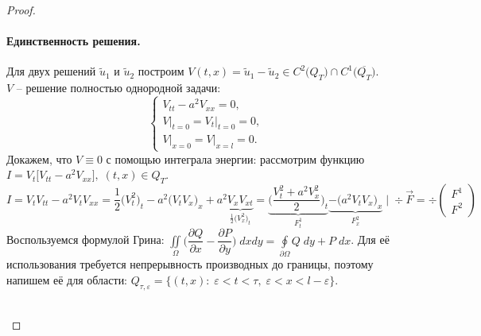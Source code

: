 \documentclass[../main.tex]{subfiles}
\begin{document}
\begin{proof}
\paragraph{Единственность решения.}
Для двух решений $\tilde{u}_{1}$ и $\tilde{u}_{2}$  построим $V(t, x) = \tilde{u}_{1} - \tilde{u}_{2} \in C^{2}\bigl(Q_{T}\bigr) \cap C^{1}\bigl(\overline{Q_T}\bigr)$.\\$V$ -- решение полностью однородной задачи:
\begin{equation*}
\begin{cases}
V_{tt} - a^2V_{xx} = 0, \\
V\bigr|_{t = 0} = V_t\bigr|_{t = 0} = 0, \\
V\bigr|_{x = 0} = V\bigr|_{x = l} = 0.
\end{cases}
\end{equation*}
Докажем, что $V \equiv 0$ с помощью интеграла энергии: рассмотрим функцию $I = V_{t}\bigl[V_{tt} - a^2V_{xx}\bigr],\; (t, x) \in Q_{T}$.
\begin{equation*}
I = V_{t}V_{tt} - a^2V_{t}V_{xx} = \dfrac{1}{2}\bigl(V_{t}^{2}\bigr)_{t} - a^2\bigl(V_{t}V_{x}
\bigr)_{x} + a^2\underbrace{V_{x}V_{xt}}_{\frac{1}{2} \bigl(V_{x}^{2}\bigr)_{t}} = \underbrace{\biggl(\dfrac{V_{t}^2 + a^2V_{x}^{2}}{2}\biggr)_{t}}_{F^1_t}  \underbrace{ - \bigl(a^{2}V_{t}V_{x}\bigr)_{x}}_{F_{x}^{2}}\; \biggr|\; \div\vec{F} = \div \begin{pmatrix}
F^1 \\
F^2
\end{pmatrix}
\end{equation*}
Воспользуемся формулой Грина: $\iint\limits_{\Omega}\biggl(\dfrac{\partial Q}{\partial x} - \dfrac{\partial P}{\partial y}\biggr)\;dxdy = \oint\limits_{\partial \Omega}Q\;dy + P\;dx$.
Для её использования требуется непрерывность производных до границы, поэтому напишем её для области: $Q_{\tau, \varepsilon} = \{(t, x)\colon\; \varepsilon < t < \tau,\; \varepsilon < x < l - \varepsilon\}$.\\
\ \\
\begin{minipage}[c]{0.2\textwidth}
\begin{center}
\end{center}
\end{minipage}
\end{proof}
\end{document}
